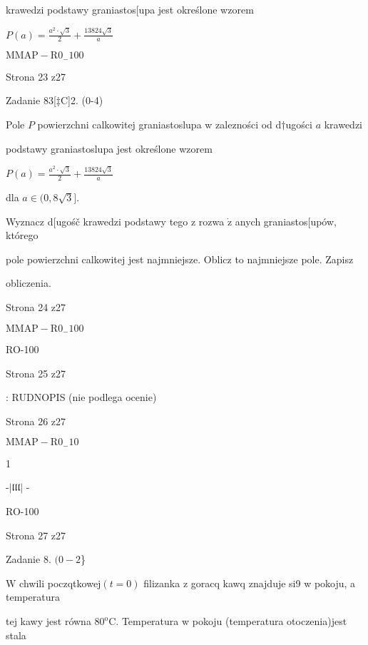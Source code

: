 \documentclass[a4paper,12pt]{article}
\begin{document}
krawedzi podstawy graniastos[upa jest określone wzorem

$P(a)=\displaystyle \frac{a^{2}\cdot\sqrt{3}}{2}+\frac{13824\sqrt{3}}{a}$

$\mathrm{M}\mathrm{M}\mathrm{A}\mathrm{P}-\mathrm{R}0_{-}100$

Strona 23 z27





Zadanie 83[‡C]2. (0-4)

Pole $P$ powierzchni calkowitej graniastoslupa w zalezności od d$\dagger$ugości $a$ krawedzi

podstawy graniastoslupa jest określone wzorem

$P(a)=\displaystyle \frac{a^{2}\cdot\sqrt{3}}{2}+\frac{13824\sqrt{3}}{a}$

dla $a\in(0,8\sqrt{3}].$

Wyznacz d[ugośč krawedzi podstawy tego z rozwa $\dot{\mathrm{z}}$ anych graniastos[upów, którego

pole powierzchni calkowitej jest najmniejsze. Oblicz to najmniejsze pole. Zapisz

obliczenia.

Strona 24 z27

$\mathrm{M}\mathrm{M}\mathrm{A}\mathrm{P}-\mathrm{R}0_{-}100$





RO-100

Strona 25 z27





: RUDNOPIS (nie podlega ocenie)

Strona 26 z27

$\mathrm{M}\mathrm{M}\mathrm{A}\mathrm{P}-\mathrm{R}0_{-}10$





1

-$|\mathfrak{l} \mathfrak{l} \mathfrak{l}|$ -

RO-100

Strona 27 z27










Zadanie 8. $(0-2$\}

$\mathrm{W}$ chwili poczqtkowej$(t=0)$ filizanka z goracq kawq znajduje si9 w pokoju, a temperatura

tej kawy jest równa $80^{\mathrm{o}}\mathrm{C}$. Temperatura w pokoju (temperatura otoczenia)jest stala
\end{document}
